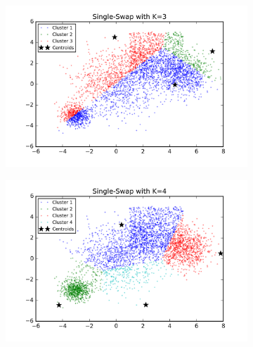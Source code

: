 \begin{figure}[htb]
        \centering
        \begin{subfigure}[b]{0.475\textwidth}
            \centering
            \includegraphics[width=\textwidth]{./figures/bigClustering_singleSwap_3.png}
        \end{subfigure}
        \hfill
        \begin{subfigure}[b]{0.475\textwidth}  
            \centering 
            \includegraphics[width=\textwidth]{./figures/bigClustering_singleSwap_4.png}
        \end{subfigure}
        \begin{subfigure}[b]{0.475\textwidth}  
            \centering 

\end{subfigure}
\end{figure}
